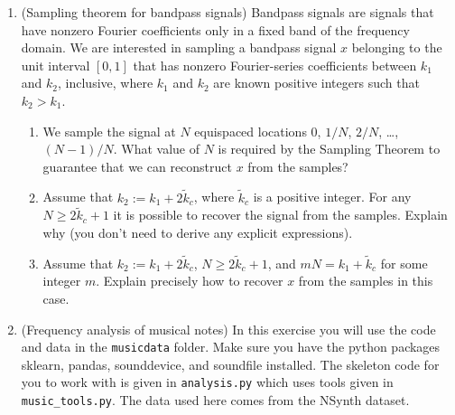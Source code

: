 \documentclass[12pt,twoside]{article}
\begin{document}
\begin{enumerate}
\item (Sampling theorem for bandpass signals) Bandpass signals are signals that have nonzero Fourier coefficients
only in a fixed band of the frequency domain. We are interested in
sampling a bandpass signal $x$ belonging to the unit interval $[0,1]$
that has nonzero Fourier-series coefficients between $k_1$ and $k_2$,
inclusive, where $k_1$ and $k_2$ are known positive integers such that $k_2 > k_1$. 
\begin{enumerate}
\item We sample the signal at $N$ equispaced locations $0$, $1/N$, $2/N$, \ldots, $(N-1)/N$. What value of $N$ is required by the Sampling Theorem to guarantee that we can reconstruct $x$ from the samples?
\item Assume that $k_2:=k_1 + 2\tilde{k}_c$, where $\tilde{k}_c $ is a positive integer. For any $N \geq 2\tilde{k}_c + 1$ it is possible to recover the signal from the samples. Explain why (you don't need to derive any explicit expressions).
\item Assume that $k_2:=k_1 + 2\tilde{k}_c$, $N\geq 2\tilde{k}_c+1$,
  and $mN = k_1+\tilde{k}_c$ for some integer $m$. Explain precisely how to recover $x$ from the samples in this case.
\end{enumerate} 
 
 \item  (Frequency analysis of musical notes) In this exercise you will
  use the code and data in the \texttt{musicdata} folder.  Make sure you have
  the python packages sklearn, pandas, sounddevice, and soundfile
  installed.  The skeleton code for you to work with is given in
  \texttt{analysis.py} which uses tools given in
  \texttt{music\_tools.py}.  The data used here comes from the NSynth
  dataset.


\end{enumerate}
\end{document}
